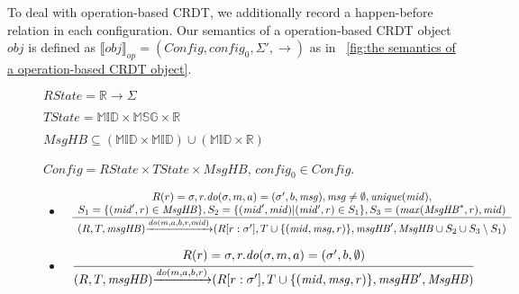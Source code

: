 To deal with operation-based CRDT, we additionally record a happen-before relation in each configuration. Our semantics of a operation-based CRDT object $\mathit{obj}$ is defined as $\llbracket \mathit{obj} \rrbracket_{\mathit{op}} = (\mathit{Config},\mathit{config}_0,\Sigma',\rightarrow)$ as in \figurename~\ref{fig:the semantics of a operation-based CRDT object}. 


\begin{figure}[ht]
$\mathit{RState} = \mathbb{R} \rightarrow \Sigma$

$\mathit{TState} = \mathbb{MID} \times \mathbb{MSG} \times \mathbb{R}$ 

$\mathit{MsgHB} \subseteq (\mathbb{MID} \times \mathbb{MID}) \cup (\mathbb{MID} \times \mathbb{R})$ 

$\mathit{Config} = \mathit{RState} \times \mathit{TState} \times \mathit{MsgHB}$, $\mathit{config}_0 \in \mathit{Config}$. 

\begin{itemize}
\setlength{\itemsep}{0.5pt}
\item[] $\begin{array}{l c}
   \bigfrac{
   \begin{array}{c}
     R(r) = \sigma, r.\mathit{do}(\sigma,m,a) = (\sigma',b,\mathit{msg}), \mathit{msg} \neq \emptyset, \mathit{unique}(\mathit{mid}), \\
     S_1 = \{ (\mathit{mid}',r) \in \mathit{MsgHB} \}, S_2 = \{ (\mathit{mid}',\mathit{mid}) \vert (\mathit{mid'},r) \in S_1 \}, S_3 = (\mathit{max}(\mathit{MsgHB}^*,r), \mathit{mid})
   \end{array}}
     {(R,T,\mathit{msgHB}) {\xrightarrow{\mathit{do}(m,a,b,r,\mathit{mid})}} (R[r:\sigma'], T \cup \{ (\mathit{mid},\mathit{msg},r) \}, \mathit{msgHB}',\mathit{MsgHB} \cup S_2 \cup S_3 \setminus S_1)}
\end{array}$ 

\item[] $\begin{array}{l c}
   \bigfrac{
   \begin{array}{c}
     R(r) = \sigma, r.\mathit{do}(\sigma,m,a) = (\sigma',b,\emptyset) 
   \end{array}}
     {(R,T,\mathit{msgHB}) {\xrightarrow{\mathit{do}(m,a,b,r)}} (R[r:\sigma'], T \cup \{ (\mathit{mid},\mathit{msg},r) \}, \mathit{msgHB}',\mathit{MsgHB})}
\end{array}$ 


\end{itemize}
\end{figure}
